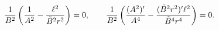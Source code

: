 \begin{equation}
{1\over B^{2}}\left( {1\over A^{2}}
-{\ell^{2}\over \tilde{B}^{2}r^{2}}
\right)=0,\qquad
{1\over B^{2}}\left( {(A^{2})'\over A^{4}}
-{(\tilde{B}^{2}r^{2})' \ell^{2}\over
\tilde{B}^{4}r^{4}}\right) =0.
\label{eq:constcond1}
\end{equation}

